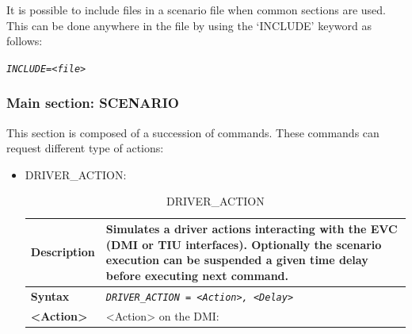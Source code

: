 \documentclass{template/openetcs}
\begin{document}
It is possible to include files in a scenario file when common sections are used. This can be done anywhere in the file by using the ‘INCLUDE’ keyword as follows: 

\emph{\texttt{INCLUDE=<file>}}

\subsubsection{Main section: SCENARIO}

This section is composed of a succession of commands. These commands can request different type of actions:

\begin{itemize}
	\item DRIVER\_ACTION:
	
		\begin{longtable}{|l|l|l|}
			\caption{DRIVER\_ACTION}\\  
			\hline
	
				\begin{minipage}[t]{0.22\linewidth} \textbf{Description} \end{minipage} 
			&	\multicolumn{2}{l|}{ \begin{minipage}[t]{0.78\linewidth} Simulates a driver actions interacting with the EVC (DMI or TIU interfaces). Optionally the scenario execution can be suspended a given time delay before executing next command. \end{minipage} } \\
			
			\hline
						
				\begin{minipage}[t]{0.22\linewidth} \textbf{Syntax}	\end{minipage}
			&	\multicolumn{2}{l|}{ \begin{minipage}[t]{0.78\linewidth} \emph{\texttt{DRIVER\_ACTION = <Action>, <Delay>}}	\end{minipage} } \\
			
			\hline
		
				\multirow{1}{*}{ \begin{minipage}[t]{0.22\linewidth} \textbf{<Action>} \end{minipage} }
			&	\multicolumn{2}{l|}{ \begin{minipage}[t]{0.78\linewidth} <Action> on the DMI: \end{minipage} } \\
			
			\hline
			

\end{longtable}
\end{itemize}
\end{document}
